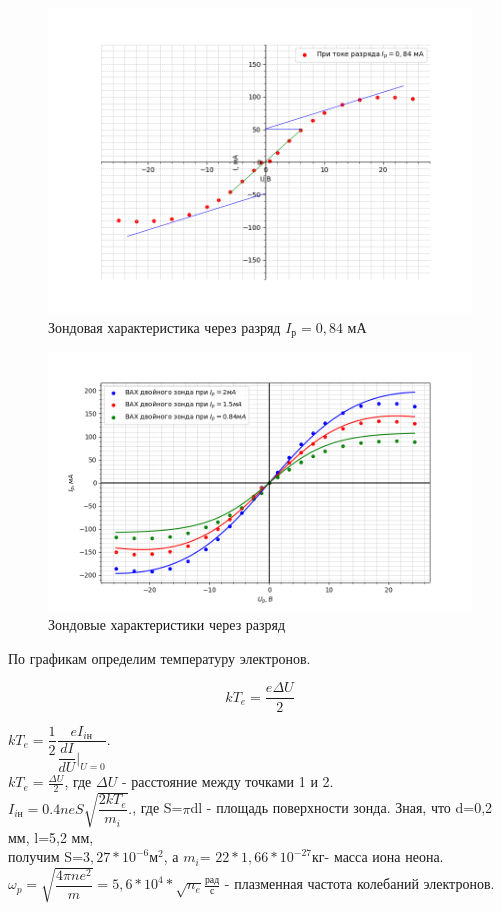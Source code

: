 \documentclass[a4paper,12pt]{article}
\begin{document}
\begin{figure}[h]
	\centering
	\includegraphics[scale=0.9]{vah-084ma.png}
	\caption{Зондовая характеристика через разряд $I_{\text{р}} = 0,84$ мА}
    \label{vah-084}
\end{figure}
\FloatBarrier
\begin{figure}[h]
	\centering
	\includegraphics[scale=0.9]{vah-all.png}
	\caption{Зондовые характеристики через разряд}
    \label{vah-all}
\end{figure}
\FloatBarrier

По графикам определим температуру электронов. 

\begin{equation*}
    kT_e=\frac{e\Delta U}{2}
\end{equation*}

$kT_e = \dfrac{1}{2}\dfrac{eI_{i\text{н}}}{\dfrac{dI}{dU}|_{U=0}}.$\\
$kT_e = \frac{\Delta U}{2}$, где $\Delta U$ - расстояние между точками 1 и 2.\\
$I_{i\text{н}} = 0.4 neS \sqrt{\dfrac{2kT_e}{m_i}}.$, где S=$\pi$dl - площадь поверхности зонда. Зная, что d=0,2 мм, l=5,2 мм,\\ получим S=$3,27*10^{-6} м^2$, а $m_i$= $22*1,66*10^{-27} кг$- масса иона неона.\\
$\omega_p = \sqrt{\dfrac{4\pi ne^2}{m}}=5,6*10^4*\sqrt{n_e} \frac{рад}{с}$ - плазменная частота колебаний электронов.\\
\end{document}
